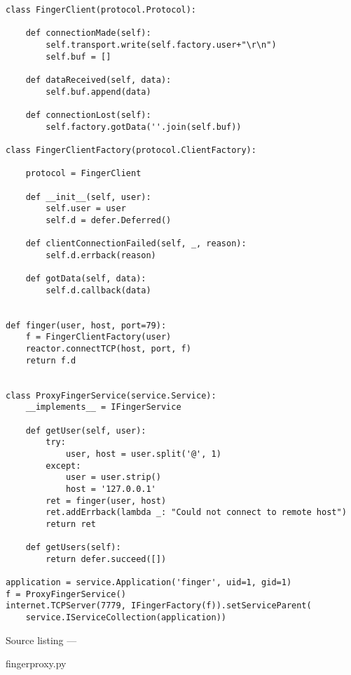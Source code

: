 \begin{verbatim}
class FingerClient(protocol.Protocol):

    def connectionMade(self):
        self.transport.write(self.factory.user+"\r\n")
        self.buf = []

    def dataReceived(self, data):
        self.buf.append(data)

    def connectionLost(self):
        self.factory.gotData(''.join(self.buf))

class FingerClientFactory(protocol.ClientFactory):

    protocol = FingerClient

    def __init__(self, user):
        self.user = user
        self.d = defer.Deferred()

    def clientConnectionFailed(self, _, reason):
        self.d.errback(reason)

    def gotData(self, data):
        self.d.callback(data)


def finger(user, host, port=79):
    f = FingerClientFactory(user)
    reactor.connectTCP(host, port, f)
    return f.d


class ProxyFingerService(service.Service):
    __implements__ = IFingerService

    def getUser(self, user):
        try:
            user, host = user.split('@', 1)
        except:
            user = user.strip()
            host = '127.0.0.1'
        ret = finger(user, host)
        ret.addErrback(lambda _: "Could not connect to remote host")
        return ret

    def getUsers(self):
        return defer.succeed([])

application = service.Application('finger', uid=1, gid=1)
f = ProxyFingerService()
internet.TCPServer(7779, IFingerFactory(f)).setServiceParent(
    service.IServiceCollection(application))
\end{verbatim}\parbox[b]{\linewidth}{\begin{center}Source listing --- \begin{em}fingerproxy.py\end{em}\end{center}}